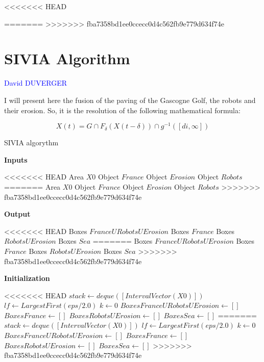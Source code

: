 <<<<<<< HEAD









=======
>>>>>>> fba7358bd1ee0ccecc0d4c562fb9e779d634f74e
\section{SIVIA Algorithm}

\vspace{0.3 cm}
	
	\textcolor{blue} {David DUVERGER}
	
	\vspace{0.5 cm}
	
	I will present here the fusion of the paving of the Gascogne Golf, the robots and their erosion. So, it is the resolution of the following mathematical formula:
	
	$$X(t) = G \cap F_{\delta}(X(t-\delta)) \cap g^{-1}([di,\infty])$$
	

\begin{algorithm}
  \caption{SIVIA algorythm}
  \vspace{0.5 cm}
  \textbf{Inputs}%
  \begin{algorithmic}[1]
<<<<<<< HEAD
    \State Area $X0$
    \State Object $France$
    \State Object $Erosion$
    \State Object $Robots$
=======
    \STATE Area $X0$
    \STATE Object $France$
    \STATE Object $Erosion$
    \STATE Object $Robots$
>>>>>>> fba7358bd1ee0ccecc0d4c562fb9e779d634f74e
  \end{algorithmic}
  \bigskip

  \textbf{Output}%
  \begin{algorithmic}[1]
<<<<<<< HEAD
    \State Boxes $France U Robots U Erosion$
    \State Boxes $France$
   	\State Boxes $Robots U Erosion$
   	\State Boxes $Sea$
=======
    \STATE Boxes $France U Robots U Erosion$
    \STATE Boxes $France$
   	\STATE Boxes $Robots U Erosion$
   	\STATE Boxes $Sea$
>>>>>>> fba7358bd1ee0ccecc0d4c562fb9e779d634f74e
  \end{algorithmic}
  \bigskip
  
  \textbf{Initialization}%
  \begin{algorithmic}[1]
<<<<<<< HEAD
   	\State $stack\gets deque([IntervalVector(X0)])$
	\State $lf\gets LargestFirst(eps/2.0)$
	\State $k\gets 0$ 
	\State $BoxesFranceURobotsUErosion\gets []$
	\State $BoxesFrance\gets []$
	\State $BoxesRobotsUErosion\gets []$
	\State $BoxesSea\gets []$
=======
   	\STATE $stack\gets deque([IntervalVector(X0)])$
	\STATE $lf\gets LargestFirst(eps/2.0)$
	\STATE $k\gets 0$ 
	\STATE $BoxesFranceURobotsUErosion\gets []$
	\STATE $BoxesFrance\gets []$
	\STATE $BoxesRobotsUErosion\gets []$
	\STATE $BoxesSea\gets []$
>>>>>>> fba7358bd1ee0ccecc0d4c562fb9e779d634f74e
  \end{algorithmic}
  
\end{algorithm}




